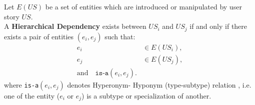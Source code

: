 \documentclass[a4paper, 11 pt, leqno, titlepage = true, toc=bib, oneside]{scrbook}
\begin{document}
\begin{defin} 
    Let $E(US)$ be a set of entities which are introduced or manipulated by user story $US$.\\
    A \textbf{Hierarchical Dependency} exists between \( US_i \) and \( US_j \) if and only if there exists a pair of entities \( (e_i, e_j) \) such that:
    \begin{align*}
        e_i & \in E(US_i), \\
        e_j & \in E(US_j), \\
        \text{and} \quad \texttt{is-a}(e_i, e_j).
    \end{align*}
    where \texttt{is-a}$(e_i, e_j)$ denotes Hyperonym- Hyponym (type-subtype) relation , i.e. one of the entity ($e_i \text{ or } e_j$) is a subtype or specialization of another.
\end{defin}
\end{document}

